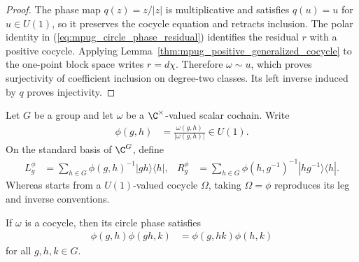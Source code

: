 \begin{proof}\leanok
    The phase map $q(z)=z/|z|$ is multiplicative and satisfies
    $q(u)=u$ for $u\in U(1)$, so it preserves the cocycle equation and
    retracts inclusion.  The polar identity in
    (\ref{eq:mpug_circle_phase_residual}) identifies the residual $r$ with a
    positive cocycle.  Applying
    Lemma~\ref{thm:mpug_positive_generalized_cocycle} to the one-point block
    space writes $r=d\chi$.  Therefore $\omega\sim u$, which proves
    surjectivity of coefficient inclusion on degree-two classes.  Its left
    inverse induced by $q$ proves injectivity.
\end{proof}

\begin{definition}
    \label{def:mpug_twisted_regular_matrices}
    \leanok
    Let $G$ be a group and let $\omega$ be a $\C^\times$-valued scalar
    cochain.  Write
    \begin{align}
        \phi(g,h) & =\frac{\omega(g,h)}{|\omega(g,h)|}\in U(1).
    \end{align}
    On the standard basis of $\C^G$, define
    \begin{align}
        L_g^\phi
         & =\sum_{h\in G}\phi(g,h)^{-1}|gh\rangle\langle h|,
         &
        R_g^\phi
         & =\sum_{h\in G}\phi(h,g^{-1})^{-1}|hg^{-1}\rangle\langle h|.
        \label{eq:mpug_twisted_regular_matrices}
    \end{align}
    Whereas \cite[lines~412--418]{FrancoRubio2025MPUGauging} starts from a
    $U(1)$-valued cocycle $\Omega$, taking $\Omega=\phi$ reproduces its leg and
    inverse conventions.
\end{definition}

\begin{lemma}
    \label{lem:mpug_circle_phase_cocycle}
    \leanok
    If $\omega$ is a cocycle, then its circle phase satisfies
    \begin{align}
        \phi(g,h)\phi(gh,k)
         & =\phi(g,hk)\phi(h,k)
    \end{align}
    for all $g,h,k\in G$.
\end{lemma}

